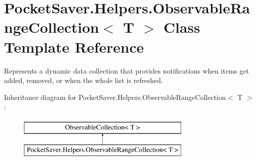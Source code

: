 \hypertarget{class_pocket_saver_1_1_helpers_1_1_observable_range_collection}{}\section{Pocket\+Saver.\+Helpers.\+Observable\+Range\+Collection$<$ T $>$ Class Template Reference}
\label{class_pocket_saver_1_1_helpers_1_1_observable_range_collection}


Represents a dynamic data collection that provides notifications when items get added, removed, or when the whole list is refreshed.  


Inheritance diagram for Pocket\+Saver.\+Helpers.\+Observable\+Range\+Collection$<$ T $>$\+:\begin{figure}[H]
\begin{center}
\leavevmode
\includegraphics[height=2.000000cm]{class_pocket_saver_1_1_helpers_1_1_observable_range_collection}
\end{center}
\end{figure}
